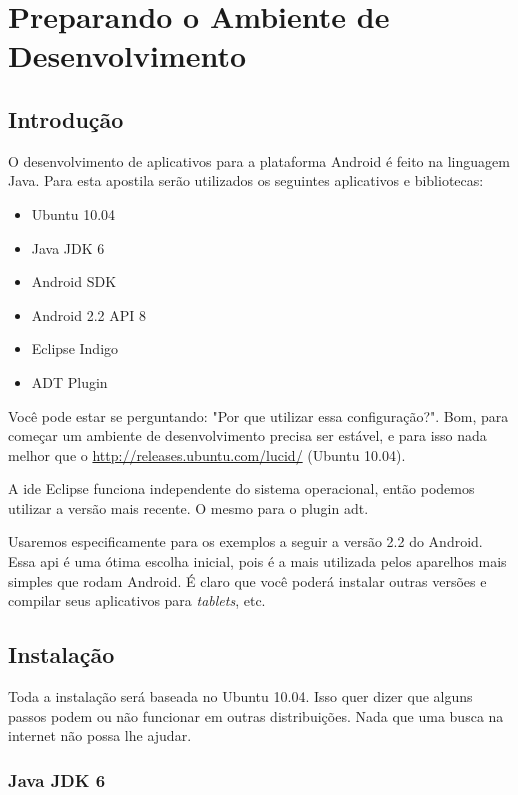 \chapter{Preparando o Ambiente de Desenvolvimento}

\section{Introdução}

O desenvolvimento de aplicativos para a plataforma Android é feito na linguagem Java.
Para esta apostila serão utilizados os seguintes aplicativos e bibliotecas:

\begin{itemize}
\item Ubuntu 10.04
\item Java JDK 6
\item Android SDK
\item Android 2.2 API 8
\item Eclipse Indigo
\item ADT Plugin
\end{itemize}

Você pode estar se perguntando: "Por que utilizar essa configuração?". Bom, para começar
um ambiente de desenvolvimento precisa ser estável, e para isso nada melhor que o
\url{http://releases.ubuntu.com/lucid/} (Ubuntu 10.04).

A \gls{ide} Eclipse funciona independente do sistema operacional, então podemos utilizar a versão
mais recente. O mesmo para o plugin \gls{adt}.

Usaremos especificamente para os exemplos a seguir a versão 2.2 do Android. Essa \gls{api} é uma
ótima escolha inicial, pois é a mais utilizada pelos aparelhos mais simples que rodam Android.
É claro que você poderá instalar outras versões e compilar seus aplicativos para \textit{tablets}, etc.

\section{Instalação}

Toda a instalação será baseada no Ubuntu 10.04. Isso quer dizer que alguns passos podem ou não
funcionar em outras distribuições. Nada que uma busca na internet não possa lhe ajudar.

\subsection{Java JDK 6}

